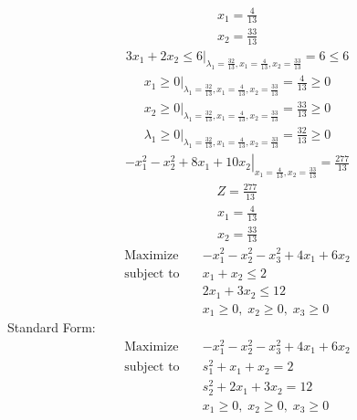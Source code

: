 \documentclass{article}
\begin{document}
\begin{align*}
x_{1}=\frac{4}{13}\end{align*}
\begin{align*}
x_{2}=\frac{33}{13}\end{align*}
\begin{align*}
\left.3x_{1} + 2x_{2}\le6\right|_{\lambda_{1}=\frac{32}{13},x_{1}=\frac{4}{13},x_{2}=\frac{33}{13}}=6\le6\end{align*}
\begin{align*}
\left.x_{1}\ge0\right|_{\lambda_{1}=\frac{32}{13},x_{1}=\frac{4}{13},x_{2}=\frac{33}{13}}=\frac{4}{13}\ge0\end{align*}
\begin{align*}
\left.x_{2}\ge0\right|_{\lambda_{1}=\frac{32}{13},x_{1}=\frac{4}{13},x_{2}=\frac{33}{13}}=\frac{33}{13}\ge0\end{align*}
\begin{align*}
\left.\lambda_{1}\ge0\right|_{\lambda_{1}=\frac{32}{13},x_{1}=\frac{4}{13},x_{2}=\frac{33}{13}}=\frac{32}{13}\ge0\end{align*}
\begin{align*}
\left.-x_{1}^{2} - x_{2}^{2} + 8x_{1} + 10x_{2}\right|_{x_{1}=\frac{4}{13},x_{2}=\frac{33}{13}}=\frac{277}{13}\end{align*}
\begin{align*}
Z=\frac{277}{13}\end{align*}
\begin{align*}
x_{1}=\frac{4}{13}\end{align*}
\begin{align*}
x_{2}=\frac{33}{13}\end{align*}
\begin{align*}
\text{Maximize} \quad & -x_{1}^{2} - x_{2}^{2} - x_{3}^{2} + 4x_{1} + 6x_{2}\\
\text{subject to} \quad
& x_{1} + x_{2}\le2\\
& 2x_{1} + 3x_{2}\le12\\
& x_{1}\ge0,\; x_{2}\ge0,\; x_{3}\ge0\end{align*}
Standard Form:\\
\begin{align*}
\text{Maximize} \quad & -x_{1}^{2} - x_{2}^{2} - x_{3}^{2} + 4x_{1} + 6x_{2}\\
\text{subject to} \quad
& s_{1}^{2} + x_{1} + x_{2}=2\\
& s_{2}^{2} + 2x_{1} + 3x_{2}=12\\
& x_{1}\ge0,\; x_{2}\ge0,\; x_{3}\ge0\end{align*}
\end{document}
